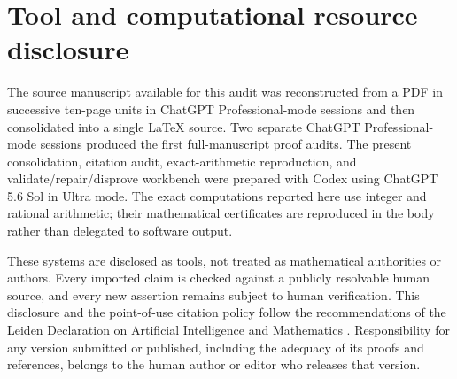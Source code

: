 \section{Tool and computational resource disclosure}

The source manuscript available for this audit was reconstructed from a PDF
in successive ten-page units in ChatGPT Professional-mode sessions and then
consolidated into a single \LaTeX{} source.  Two separate ChatGPT
Professional-mode sessions produced the first full-manuscript proof audits.
The present consolidation, citation audit, exact-arithmetic reproduction, and
validate/repair/disprove workbench were prepared with Codex using ChatGPT
5.6 Sol in Ultra mode.  The exact computations reported here use integer and
rational arithmetic; their mathematical certificates are reproduced in the
body rather than delegated to software output.

These systems are disclosed as tools, not treated as mathematical
authorities or authors.  Every imported claim is checked against a publicly
resolvable human source, and every new assertion remains subject to human
verification.  This disclosure and the point-of-use citation policy follow
the recommendations of the Leiden Declaration on Artificial Intelligence and
Mathematics \cite{Leiden2026}.  Responsibility for any version submitted or
published, including the adequacy of its proofs and references, belongs to
the human author or editor who releases that version.

